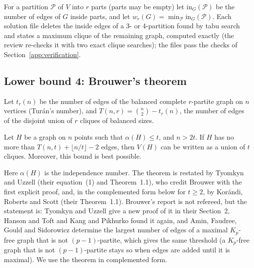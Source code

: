 For a partition $\mathcal{P}$ of $V$ into $r$ parts (parts may be empty) let
$\mathrm{in}_G(\mathcal{P})$ be the number of edges of $G$ inside parts, and let
$w_r(G)=\min_{\mathcal{P}}\mathrm{in}_G(\mathcal{P})$. Each solution file deletes the inside edges
of a 3- or 4-partition found by tabu search and states a maximum clique of the
remaining graph, computed exactly (the review re-checks it with two exact
clique searches\cite{bron1973algorithm,tomita2006worst,carraghan1990exact});
the files pass the checks of Section~\ref{app:verification}.

\subsection{Lower bound 4: Brouwer's theorem}

Let $t_r(n)$ be the number of edges of the balanced complete $r$-partite graph
on $n$ vertices (Tur\'an's number), and
$T(n,r)=\binom n2-t_r(n)$, the number of edges of the disjoint union of $r$
cliques of balanced sizes.

\begin{theorem}[Brouwer 1981, Theorem~2\cite{brouwer1981lotto}; quoted, with his $G$ renamed $H$ and his $m:=\lfloor n/t\rfloor$ written out]\label{thm:brouwer}
Let $H$ be a graph on $n$ points such that
$\alpha(H)\le t$, and $n>2t$. If $H$ has no more than $T(n,t)+\lfloor n/t\rfloor-2$
edges, then $V(H)$ can be written as a union of $t$ cliques. Moreover, this
bound is best possible.
\end{theorem}

Here $\alpha(H)$ is the independence number. The theorem is restated by
Tyomkyn and Uzzell\cite{tyomkyn2015strong} (their equation~(1) and
Theorem~1.1), who credit Brouwer with the first explicit proof, and, in the
complemented form below for $t\ge 2$, by Kor\'andi, Roberts and
Scott\cite{korandi2021exact} (their Theorem~1.1). Brouwer's report is not
refereed, but the statement is: Tyomkyn and Uzzell give a new proof of it in
their Section~2, Hanson and Toft and Kang and Pikhurko found it
again,\cite{hanson1991ksaturated,kang2005maximum} and Amin, Faudree, Gould and
Sidorowicz\cite{amin2013non} determine the largest number of edges of a maximal
$K_p$-free graph that is not $(p-1)$-partite, which gives the same threshold
(a $K_p$-free graph that is not $(p-1)$-partite stays so when edges are added
until it is maximal). We use the theorem in complemented form.

